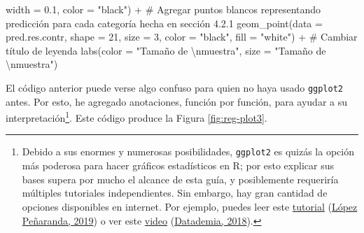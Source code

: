 \documentclass[
  bookmarksnumbered]{article}
\newenvironment{Shaded}{\begin{snugshade}}{\end{snugshade}}
\newcommand{\AttributeTok}[1]{\textcolor[rgb]{0.00,0.34,0.68}{#1}}
\newcommand{\CommentTok}[1]{\textcolor[rgb]{0.54,0.53,0.53}{#1}}
\newcommand{\DecValTok}[1]{\textcolor[rgb]{0.69,0.50,0.00}{#1}}
\newcommand{\FloatTok}[1]{\textcolor[rgb]{0.69,0.50,0.00}{#1}}
\newcommand{\FunctionTok}[1]{\textcolor[rgb]{0.39,0.29,0.61}{#1}}
\newcommand{\NormalTok}[1]{\textcolor[rgb]{0.12,0.11,0.11}{#1}}
\newcommand{\SpecialCharTok}[1]{\textcolor[rgb]{0.24,0.68,0.91}{#1}}
\newcommand{\StringTok}[1]{\textcolor[rgb]{0.75,0.01,0.01}{#1}}
\begin{document}
\begin{Shaded}
\begin{Highlighting}[]
                \AttributeTok{width =} \FloatTok{0.1}\NormalTok{,}
                \AttributeTok{color =} \StringTok{"black"}\NormalTok{) }\SpecialCharTok{+}
  \CommentTok{\# Agregar puntos blancos representando predicción para cada categoría hecha en sección 4.2.1}
  \FunctionTok{geom\_point}\NormalTok{(}\AttributeTok{data =}\NormalTok{ pred.res.contr,}
             \AttributeTok{shape =} \DecValTok{21}\NormalTok{, }\AttributeTok{size =} \DecValTok{3}\NormalTok{,}
             \AttributeTok{color =} \StringTok{"black"}\NormalTok{, }\AttributeTok{fill =} \StringTok{"white"}\NormalTok{) }\SpecialCharTok{+}
  \CommentTok{\# Cambiar título de leyenda}
  \FunctionTok{labs}\NormalTok{(}\AttributeTok{color =} \StringTok{"Tamaño de }\SpecialCharTok{\textbackslash{}n}\StringTok{muestra"}\NormalTok{,}
       \AttributeTok{size =} \StringTok{"Tamaño de }\SpecialCharTok{\textbackslash{}n}\StringTok{muestra"}\NormalTok{)}
\end{Highlighting}
\end{Shaded}

El código anterior puede verse algo confuso para quien no haya usado \texttt{ggplot2} antes. Por esto, he agregado anotaciones, función por función, para ayudar a su interpretación\footnote{Debido a sus enormes y numerosas posibilidades, \texttt{ggplot2} es quizás la opción más poderosa para hacer gráficos estadísticos en R; por esto explicar sus bases supera por mucho el alcance de esta guía, y posiblemente requeriría múltiples tutoriales independientes. Sin embargo, hay gran cantidad de opciones disponibles en internet. Por ejemplo, puedes leer este \href{https://rpubs.com/anlope10/562981}{tutorial} (\protect\hyperlink{ref-lopezpenarandaTutorialGgplot22019}{López Peñaranda, 2019}) o ver este \href{https://youtu.be/BUzTAr_QqKs}{video} (\protect\hyperlink{ref-datademiaAprendeGgplot22018}{Datademia, 2018}).}. Este código produce la Figura \ref{fig:reg-plot3}.
\end{document}
